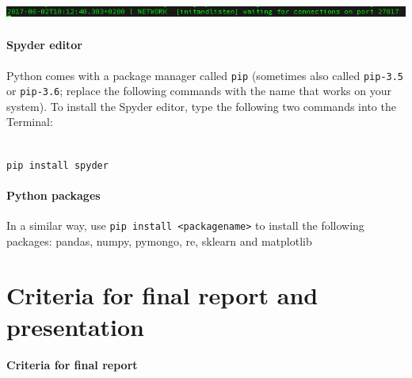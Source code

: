 \documentclass[a4paper]{report}
\newcommand{\blankline}{\par\vspace{5mm}}
\begin{document}
\noindent\includegraphics[width=6.4953in,height=0.1783in]{Syllabus-img6.png} 

\paragraph{Spyder editor}
Python comes with a package manager called {\small\texttt{pip}} (sometimes also
called {\small\texttt{pip-3.5}} or {\small\texttt{pip-3.6}}; replace the following commands with
the name that works on your system). To install the Spyder editor,
type the following two commands into the Terminal: 

\\
{\small\texttt{pip install spyder}}

\paragraph{Python packages}
In a similar way, use {\small\texttt{pip install {\textless}packagename{\textgreater}}} to install the following packages: pandas, numpy, pymongo, re, sklearn and matplotlib 

\blankline

\section*{Criteria for final report and presentation}

\paragraph{Criteria for final report}
\end{document}
